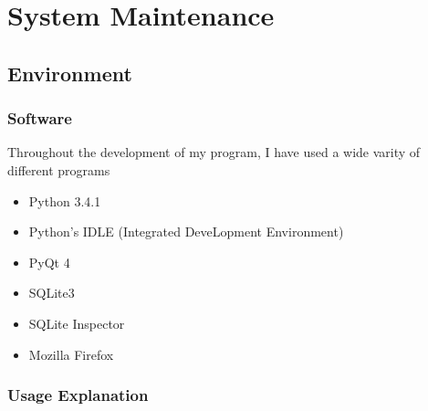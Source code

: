\chapter{System Maintenance}

\section{Environment}

\subsection{Software}
Throughout the development of my program, I have used a wide varity of different programs\begin{itemize}
    \item Python 3.4.1
    \item Python's IDLE (Integrated DeveLopment Environment)
    \item PyQt 4
    \item SQLite3
    \item SQLite Inspector
    \item Mozilla Firefox
\end{itemize}


\subsection{Usage Explanation}

